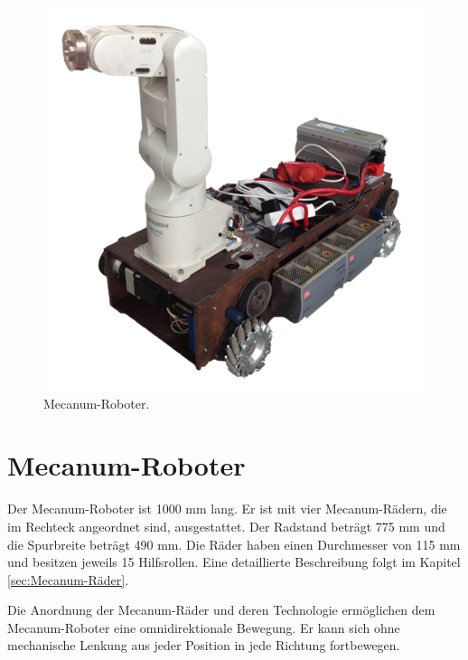\newpage
\begin{figure}[H]
\centering
 \includegraphics[width=.6\textwidth]{Abbildungen/Roboter} 
\caption[Mecanum-Roboter]{Mecanum-Roboter.}
\label{fig:Roboter}
\end{figure}

\section {Mecanum-Roboter}
\label{sec:Mecanum-Roboter}

Der Mecanum-Roboter ist 1000 mm lang. Er ist mit vier Mecanum-Rädern, die im Rechteck angeordnet sind, ausgestattet. Der Radstand beträgt 775 mm und die Spurbreite beträgt 490 mm. Die Räder haben einen Durchmesser von 115 mm und besitzen jeweils 15 Hilfsrollen. Eine detaillierte Beschreibung folgt im Kapitel \ref{sec:Mecanum-Räder}.

Die Anordnung der Mecanum-Räder und deren Technologie ermöglichen dem Mecanum-Roboter eine omnidirektionale Bewegung. Er kann sich ohne mechanische Lenkung aus jeder Position in jede Richtung fortbewegen.

